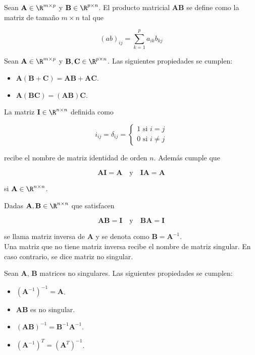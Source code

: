 \begin{defi}
Sean $\mathbf{A} \in \R^{m \times p}$ y $\mathbf{B} \in \R^{p \times n}$. El producto matricial $\mathbf{A}\mathbf{B}$ se define como la matriz de tamaño $m \times n$ tal que

\[ (ab)_{ij} = \sum_{k=1}^{p} a_{ik}b_{kj} \] 
\end{defi}

\begin{defi}
Sean $\mathbf{A} \in \R^{m \times p}$ y $\mathbf{B}, \mathbf{C} \in \R^{p \times n}$. Las siguientes propiedades se cumplen:

\begin{itemize}
\item $\mathbf{A}(\mathbf{B} + \mathbf{C}) = \mathbf{A}\mathbf{B} + \mathbf{A}\mathbf{C}$.
\item $\mathbf{A}(\mathbf{B} \mathbf{C}) = (\mathbf{A}\mathbf{B})\mathbf{C}$.
\end{itemize}
\end{defi}

\begin{defi}
La matriz $\mathbf{I} \in \R^{n \times n}$ definida como 

\[ i_{ij} = \delta_{ij} = \begin{cases}
1 \text{ si } i = j\\
0 \text{ si } i \neq j
\end{cases} \]

recibe el nombre de matriz identidad de orden $n$. Además cumple que 

\[\mathbf{A} \mathbf{I} = \mathbf{A}\quad \text{y} \quad \mathbf{I} \mathbf{A} = \mathbf{A}\]

si $\mathbf{A} \in \R^{n \times n}$.
\end{defi}

\begin{defi}
Dadas $\mathbf{A}, \mathbf{B} \in \R^{n \times n}$ que satisfacen 

\[ \mathbf{A} \mathbf{B} = \mathbf{I} \quad \text{y} \quad \mathbf{B} \mathbf{A} = \mathbf{I} \]

se llama matriz inversa de $\mathbf{A}$ y se denota como $\mathbf{B} = \mathbf{A}^{-1}$.\\

Una matriz que no tiene matriz inversa recibe el nombre de matriz singular. En caso contrario, se dice matriz no singular. 
\end{defi}

\begin{defi}
Sean $\mathbf{A}$, $\mathbf{B}$ matrices no singulares. Las siguientes propiedades se cumplen:

\begin{itemize}
\item $(\mathbf{A}^{-1})^{-1} = \mathbf{A}$.
\item $\mathbf{A} \mathbf{B}$ es no singular.
\item $(\mathbf{A} \mathbf{B})^{-1} = \mathbf{B}^{-1} \mathbf{A}^{-1}$.
\item $(\mathbf{A}^{-1})^T = (\mathbf{A}^T)^{-1}$.
\end{itemize}
\end{defi}

